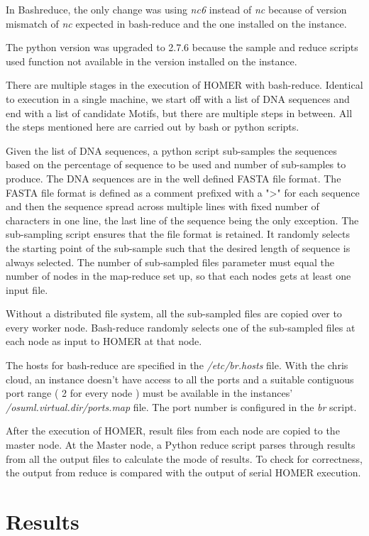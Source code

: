 \documentclass{acm_proc_article-sp}
\begin{document}
In Bashreduce, the only change was using \textit{nc6} instead of \textit{nc} because of version mismatch of \textit{nc} expected in bash-reduce and the one installed on the instance. 

The python version was upgraded to 2.7.6 because the sample and reduce scripts used function not available in the version installed on the instance. 

There are multiple stages in the execution of HOMER with bash-reduce. Identical to execution in a single machine, we start off with a list of DNA sequences and end with a list of candidate Motifs, but there are multiple steps in between. All the steps mentioned here are carried out by bash or python scripts.

Given the list of DNA sequences, a python script sub-samples the sequences based on the percentage of sequence to be used and number of sub-samples to produce. The DNA sequences are in the well defined FASTA file format. The FASTA file format is defined as a comment prefixed with a ">" for each sequence and then the sequence spread across multiple lines with fixed number of characters in one line, the last line of the sequence being the only exception. The sub-sampling script ensures that the file format is retained. It randomly selects the starting point of the sub-sample such that the desired length of sequence is always selected. The number of sub-sampled files parameter must equal the number of nodes in the map-reduce set up, so that each nodes gets at least one input file. 

Without a distributed file system, all the sub-sampled files are copied over to every worker node. Bash-reduce randomly selects one of the sub-sampled files at each node as input to HOMER at that node. 

The hosts for bash-reduce are specified in the \textit{/etc/br.hosts} file. With the chris cloud, an instance doesn't have access to all the ports and a suitable contiguous port range ( 2 for every node ) must be available in the instances' \textit{/osuml.virtual.dir/ports.map} file. The port number is configured in the \textit{br} script.

After the execution of HOMER, result files from each node are copied to the master node. At the Master node, a Python reduce script parses through results from all the output files to calculate the mode of results. To check for correctness, the output from reduce is compared with the output of serial HOMER execution.


\section{Results}
\end{document}
